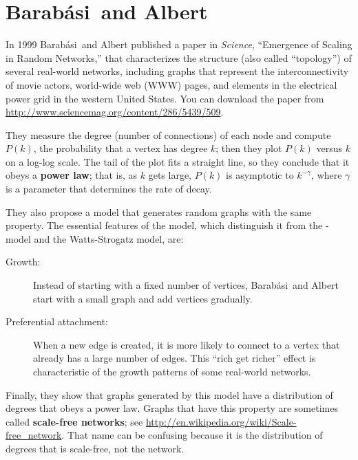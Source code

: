 \documentclass[10pt]{book}
\begin{document}
\newcommand{\Barabasi}{Barab\'{a}si}

\section{\Barabasi~and Albert}
\label{scale.free}

In 1999 \Barabasi~and Albert published a paper in {\em Science},
``Emergence of Scaling in Random Networks,'' that characterizes the
structure (also called ``topology'') of several real-world networks,
including graphs that represent the interconnectivity of movie actors,
world-wide web (WWW) pages, and elements in the electrical power grid
in the western United States.  You can download the paper from
\url{http://www.sciencemag.org/content/286/5439/509}.
  

They measure the degree (number of connections) of each node and
compute $P(k)$, the probability that a vertex has degree $k$; then
they plot $P(k)$ versus $k$ on a log-log scale.  The tail of the plot
fits a straight line, so they conclude that it obeys a {\bf power
  law}; that is, as $k$ gets large, $P(k)$ is asymptotic to
$k^{- \gamma}$, where $\gamma$ is a parameter that determines the rate
of decay.

They also propose a model that generates random graphs with the same
property.  The essential features of the model, which distinguish it
from the \Erdos-\Renyi~ model and the Watts-Strogatz model, are:

\begin{description}

\item[Growth:]  Instead of starting with a fixed number of vertices,
\Barabasi~and Albert start with a small graph and add vertices gradually.

\item[Preferential attachment:] When a new edge is created, it is
more likely to connect to a vertex that already has a large number
of edges.  This ``rich get richer'' effect is characteristic of
the growth patterns of some real-world networks.

\end{description}

Finally, they show that graphs generated by this model have a
distribution of degrees that obeys a power law.  Graphs that
have this property are sometimes called {\bf scale-free networks};
see \url{http://en.wikipedia.org/wiki/Scale-free_network}.
That name can be confusing because it is the distribution
of degrees that is scale-free, not the network.
\end{document}
